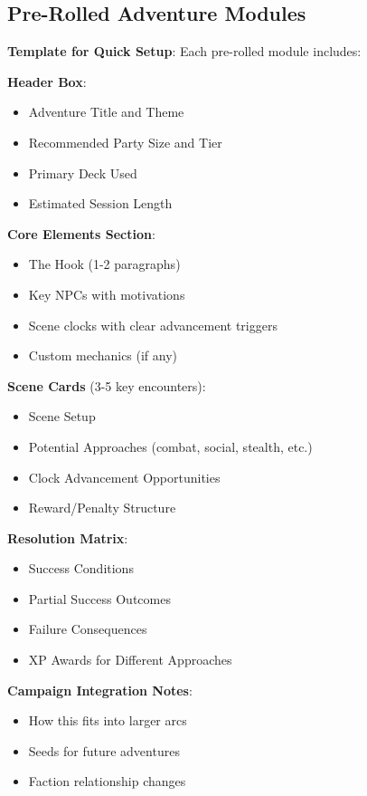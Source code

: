 \documentclass[11pt]{article}
\begin{document}
\subsection*{Pre-Rolled Adventure Modules}

\begin{mdframed}[backgroundcolor=modulebg]
\textbf{Template for Quick Setup}: Each pre-rolled module includes:

\textbf{Header Box}:
\begin{itemize}[leftmargin=*]
\item Adventure Title and Theme
\item Recommended Party Size and Tier
\item Primary Deck Used
\item Estimated Session Length
\end{itemize}

\textbf{Core Elements Section}:
\begin{itemize}[leftmargin=*]
\item The Hook (1-2 paragraphs)
\item Key NPCs with motivations
\item Scene clocks with clear advancement triggers
\item Custom mechanics (if any)
\end{itemize}

\textbf{Scene Cards} (3-5 key encounters):
\begin{itemize}[leftmargin=*]
\item Scene Setup
\item Potential Approaches (combat, social, stealth, etc.)
\item Clock Advancement Opportunities
\item Reward/Penalty Structure
\end{itemize}

\textbf{Resolution Matrix}:
\begin{itemize}[leftmargin=*]
\item Success Conditions
\item Partial Success Outcomes
\item Failure Consequences
\item XP Awards for Different Approaches
\end{itemize}

\textbf{Campaign Integration Notes}:
\begin{itemize}[leftmargin=*]
\item How this fits into larger arcs
\item Seeds for future adventures
\item Faction relationship changes
\end{itemize}
\end{mdframed}
\end{document}

